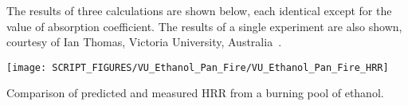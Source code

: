 The results of three calculations are shown below, each identical except for the value of absorption coefficient. The results of a single experiment
are also shown, courtesy of Ian Thomas, Victoria University, Australia~\cite{Thomas:JFPE}.


\begin{center}
\texttt{[image: SCRIPT\_FIGURES/VU\_Ethanol\_Pan\_Fire/VU\_Ethanol\_Pan\_Fire\_HRR]}
\caption{Comparison of predicted and measured HRR from a burning pool of ethanol.}
\end{center}


